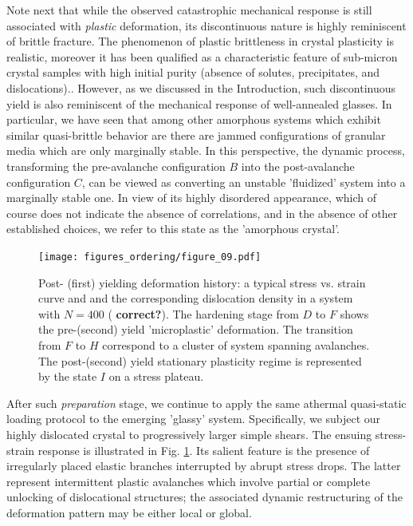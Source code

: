 \documentclass[aps,
superscriptaddress,notitlepage]{revtex4-1}
\begin{document}
Note next that while the observed catastrophic  mechanical response  is still associated with \emph{plastic} deformation, its  discontinuous nature  is highly reminiscent of brittle fracture. The phenomenon of  plastic brittleness in crystal plasticity is  realistic,  moreover   it has been qualified as  a characteristic feature of sub-micron crystal samples with high initial purity (absence of solutes, precipitates, and dislocations).\cite{bei2008effects,chrobak2011deconfinement,wang2012pristine,Cui2017-xn,Greer2011-hi,Brenner1956-rx,Brenner1958-dr,Sharma2018-iw,Mordehai2018-qm,Lilleodden2006-jq,Corcoran1997-vt}. However, as we discussed in the Introduction, such discontinuous yield  is also reminiscent of the  mechanical response  of well-annealed glasses.  In particular, we have seen that among other amorphous systems which exhibit similar quasi-brittle behavior  are there are  jammed configurations of  granular media which  are only marginally stable. In this perspective, the dynamic  process, transforming the  pre-avalanche configuration $B$ into the  post-avalanche  configuration $C$,  can be viewed as  converting an unstable  'fluidized' system into a marginally stable one. In view of its highly disordered appearance, which of course does not indicate the absence of correlations,  and in the absence of other established choices,  we refer to this state as the 'amorphous crystal'. 
\begin{figure}[h!]
\texttt{[image: figures\_ordering/figure\_09.pdf]}
\caption{Post- (first) yielding deformation history: a typical stress vs. strain curve and and the corresponding  dislocation density in a system with $N=400$ (\textbf{ correct?}).  The hardening stage from $D$ to $F$ shows the pre-(second) yield 'microplastic' deformation. The transition from $F$ to $H$ correspond to a cluster of system spanning avalanches. The post-(second) yield stationary plasticity regime is represented by the state $I$ on a stress plateau.}
\label{fig:2}
\end{figure}

 

After such   \emph{preparation}  stage, we continue to apply the same  athermal quasi-static loading  protocol to the emerging  'glassy' system.  Specifically,  we subject our  highly dislocated crystal to progressively larger simple shears.  The ensuing stress-strain response  is illustrated in Fig. \ref{fig:2}. Its salient feature   is  the presence of   irregularly placed elastic branches   interrupted by abrupt  stress drops. The latter represent intermittent  plastic avalanches  which  involve partial or complete unlocking of  dislocational structures;  the associated dynamic  restructuring of the deformation pattern may be  either local or global.
\end{document}
